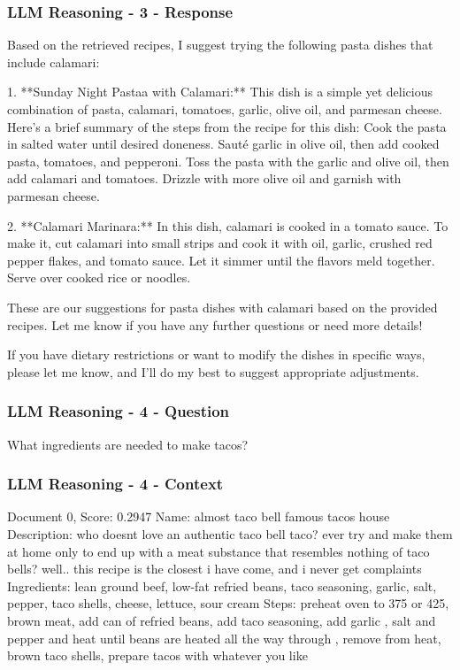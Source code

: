 \documentclass[a4paper,11pt]{article}
\begin{document}
\subsubsection{LLM Reasoning - 3 - Response}
Based on the retrieved recipes, I suggest trying the following pasta dishes that include calamari:

1. **Sunday Night Pastaa with Calamari:** This dish is a simple yet delicious combination of pasta, calamari, 
tomatoes, garlic, olive oil, and parmesan cheese. Here's a brief summary of the steps from the recipe for this dish:
Cook the pasta in salted water until desired doneness. Sauté garlic in olive oil, then add cooked pasta, tomatoes, 
and pepperoni. Toss the pasta with the garlic and olive oil, then add calamari and tomatoes. Drizzle with more olive oil and garnish with parmesan cheese.

2. **Calamari Marinara:** In this dish, calamari is cooked in a tomato sauce. To make it, cut calamari into small strips
and cook it with oil, garlic, crushed red pepper flakes, and tomato sauce. Let it simmer until the flavors meld together.
Serve over cooked rice or noodles.

These are our suggestions for pasta dishes with calamari based on the provided recipes. Let me know if you have any further questions or need more details!

If you have dietary restrictions or want to modify the dishes in specific ways, please let me know, and I'll do my best to suggest appropriate adjustments.

\subsubsection{LLM Reasoning - 4 - Question}
What ingredients are needed to make tacos?

\subsubsection{LLM Reasoning - 4 - Context}
Document 0, Score: 0.2947
Name: almost taco bell famous tacos house
Description: who doesnt love an authentic taco bell taco?  ever try and make them at home only to end up with a meat substance that resembles nothing of taco bells? well.. this recipe is the closest i have come, and i never get complaints 
Ingredients: lean ground beef, low-fat refried beans, taco seasoning, garlic, salt, pepper, taco shells, cheese, lettuce, sour cream
Steps: preheat oven to 375 or 425, brown meat, add can of refried beans, add taco seasoning, add garlic , salt and pepper and heat until beans are heated all the way through , remove from heat, brown taco shells, prepare tacos with whatever you like
\end{document}
